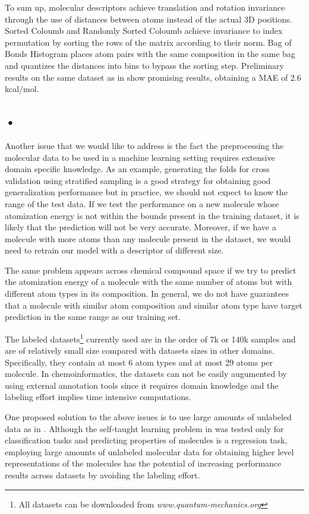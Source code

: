 \documentclass[10pt,journal,a4paper]{IEEEtran}
\begin{document}
To sum up, molecular descriptors achieve translation and rotation invariance through the use of
distances between atoms instead of the actual 3D positions. Sorted Coloumb and Randomly Sorted Coloumb achieve invariance to index permutation by sorting the rows of the matrix according to their norm. Bag of Bonds Histogram places atom pairs with the same composition in the same bag and quantizes the distances into bins to bypass the sorting step. Preliminary results on the same dataset as in \cite{montavon2012learning}  show promising results, obtaining a MAE of 2.6 kcal/mol.

\subsection*{•}
Another issue that we would like to address is the fact the preprocessing the molecular data to be used in a machine learning setting requires extensive domain specific knowledge. As an example, generating the folds for cross validation using stratified sampling is a good strategy for obtaining good generalization performance but in practice, we should not expect to know the range of the test data. If we test the performance on a new molecule whose atomization energy is not within the bounds present in the training dataset, it is likely that the prediction will not be very accurate. Moreover, if we have a molecule with more atoms than any molecule present in the dataset, we would need to retrain our model with a  descriptor of different size. 

The same problem appears across chemical compound space if we try to predict the atomization energy of a molecule with the same number of atoms but with different atom types in its composition. In general, we do not have guarantees that a molecule with similar atom composition and similar atom type have target prediction in the same range as our training set.

The labeled datasets\footnote{All datasets can be downloaded from \textit{www.quantum-mechanics.org}} currently used  are in the order of 7k or 140k samples and are of relatively small size compared with datasets sizes in other domains. Specifically, they contain at most 6 atom types and at most 29 atoms per molecule. In chemoinformatics, the datasets can not be easily augumented by using external annotation tools since it requires domain knowledge and the labeling effort implies time intensive computations.

One proposed solution to the above issues is to use large amounts of unlabeled data as in \cite{selftaughtl}.
Although the self-taught learning problem in \cite{selftaughtl} was tested only for classification tasks and predicting properties of molecules is a regression task, employing large amounts of unlabeled molecular data for obtaining higher level representations of the molecules has the potential of increasing performance results across datasets by avoiding the labeling effort.
\end{document}
